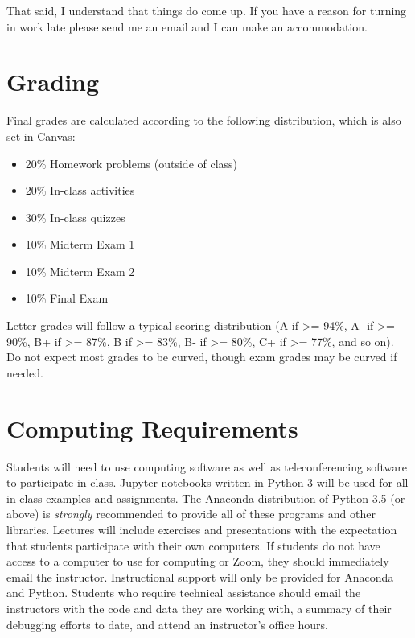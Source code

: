\documentclass[10pt]{memoir}
\begin{document}
That said, I understand that things do come up. If you have a reason for turning in work late please send me an email and I can make an accommodation.

\section{\textbf{Grading}}

Final grades are calculated according to the following distribution, which is also set in Canvas:

\begin{itemize}
\item 20\% Homework problems (outside of class)
\item 20\% In-class activities
\item 30\% In-class quizzes
\item 10\% Midterm Exam 1
\item 10\% Midterm Exam 2
\item 10\% Final Exam
\end{itemize}

Letter grades will follow a typical scoring distribution (A if >= 94\%, A- if >= 90\%, B+ if >=
87\%, B if >= 83\%, B- if >= 80\%, C+ if >= 77\%, and so on). Do not expect most grades to be
curved, though exam grades may be curved if needed.

\section{\textbf{Computing Requirements}}
Students will need to use computing software as well as teleconferencing software to participate in class. \href{http://jupyter.org/}{Jupyter notebooks} written in Python 3 will be used for all in-class examples and assignments. The \href{https://www.continuum.io/why-anaconda}{Anaconda distribution} of Python 3.5 (or above) is \textit{strongly} recommended to provide all of these programs and other libraries. Lectures will include exercises and presentations with the expectation that students participate with their own computers. If students do not have access to a computer to use for computing or Zoom, they should immediately email the instructor. Instructional support will only be provided for Anaconda and Python. Students who require technical assistance should email the instructors with the code and data they are working with, a summary of their debugging efforts to date, and attend an instructor's office hours.

\clearpage
\end{document}
